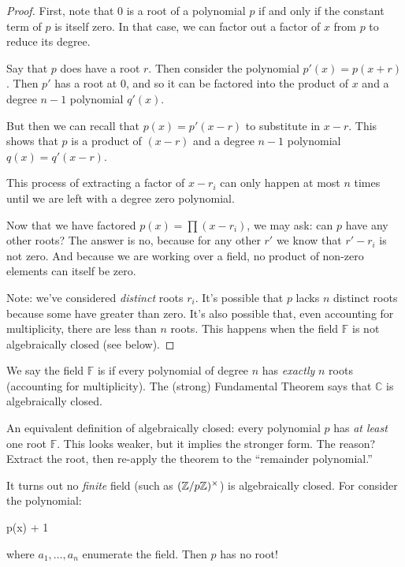 \begin{proof}
  First, note that 0 is a root of a polynomial $p$ if and only if the
  constant term of $p$ is itself zero. In that case, we can factor out a
  factor of $x$ from $p$ to reduce its degree.

  Say that $p$ does have a root $r$. Then consider the polynomial $p'(x)
  = p(x + r)$. Then $p'$ has a root at 0, and so it can be factored into
  the product of $x$ and a degree $n-1$ polynomial $q'(x)$.

  But then we can recall that $p(x) = p'(x - r)$ to substitute in $x -
  r$. This shows that $p$ is a product of $(x - r)$ and a degree $n-1$
  polynomial $q(x) = q'(x - r)$.

  This process of extracting a factor of $x - r_i$ can only happen at
  most $n$ times until we are left with a degree zero polynomial.

  Now that we have factored $p(x) = \prod (x - r_i)$, we may ask: can
  $p$ have any other roots? The answer is no, because for any other $r'$
  we know that $r' - r_i$ is not zero. And because we are working over a
  field, no product of non-zero elements can itself be zero.

  Note: we've considered \emph{distinct} roots $r_i$. It's possible that
  $p$ lacks $n$ distinct roots because some have 
  greater than zero. It's also possible that, even accounting for
  multiplicity, there are less than $n$ roots. This happens when the
  field $\mathbb{F}$ is not algebraically closed (see below).
\end{proof}

\begin{remark}
  We say the field $\mathbb{F}$ is  if
  every polynomial of degree $n$ has \emph{exactly} $n$ roots
  (accounting for multiplicity). The (strong) Fundamental Theorem says
  that $\mathbb{C}$ is algebraically closed.

  An equivalent definition of algebraically closed: every polynomial $p$
  has \emph{at least} one root $\mathbb{F}$. This looks weaker, but it
  implies the stronger form. The reason? Extract the root, then re-apply
  the theorem to the ``remainder polynomial.''

  It turns out no \emph{finite} field (such as $\mathopen{}\left( {\mathbb{Z} / p\mathbb{Z}} \right)\mathclose{}^\times$) is
  algebraically closed. For consider the polynomial:

  \begin{nedqn}
    p(x)
  \eqcol
    \cdots
    + 1
  \end{nedqn}

  \noindent
  where $a_1, \ldots, a_n$ enumerate the field. Then $p$ has no root!
\end{remark}

